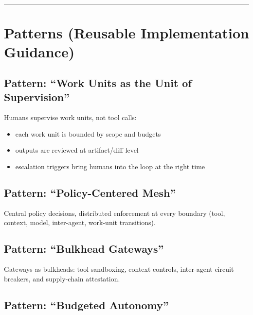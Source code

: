 \documentclass[11pt]{article}
\begin{document}
\vspace{2pt}\begin{center}\rule{0.62\linewidth}{0.6pt}\end{center}\vspace{2pt}

\hypertarget{patterns-reusable-implementation-guidance}{%
\section{Patterns (Reusable Implementation Guidance)}\label{patterns-reusable-implementation-guidance}}

\hypertarget{pattern-work-units-as-the-unit-of-supervision}{%
\subsection{Pattern: ``Work Units as the Unit of Supervision''}\label{pattern-work-units-as-the-unit-of-supervision}}

Humans supervise work units, not tool calls:

\begin{itemize}
\tightlist
\item
  each work unit is bounded by scope and budgets
\item
  outputs are reviewed at artifact/diff level
\item
  escalation triggers bring humans into the loop at the right time
\end{itemize}

\hypertarget{pattern-policy-centered-mesh}{%
\subsection{Pattern: ``Policy-Centered Mesh''}\label{pattern-policy-centered-mesh}}

Central policy decisions, distributed enforcement at every boundary
(tool, context, model, inter-agent, work-unit transitions).

\hypertarget{pattern-bulkhead-gateways}{%
\subsection{Pattern: ``Bulkhead Gateways''}\label{pattern-bulkhead-gateways}}

Gateways as bulkheads: tool sandboxing, context controls, inter-agent
circuit breakers, and supply-chain attestation.

\hypertarget{pattern-budgeted-autonomy}{%
\subsection{Pattern: ``Budgeted Autonomy''}\label{pattern-budgeted-autonomy}}
\end{document}

